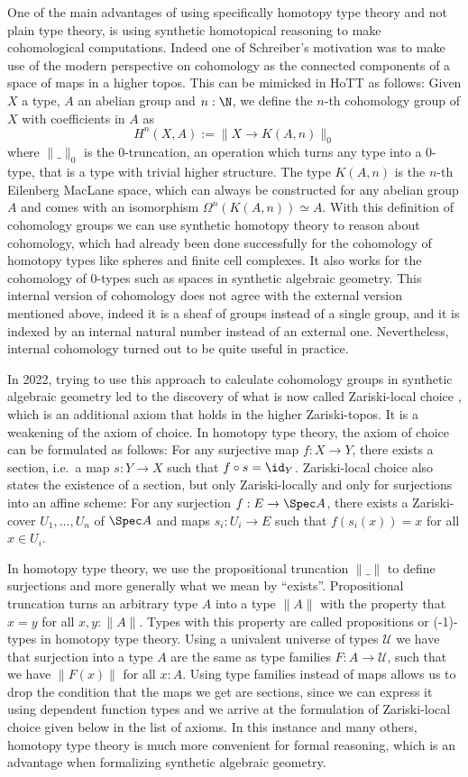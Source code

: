 One of the main advantages of using specifically homotopy type theory and not plain type theory, is using synthetic homotopical reasoning to make cohomological computations. Indeed one of Schreiber's motivation was to make use of the modern perspective on cohomology as the connected components of a space of maps in a higher topos. This can be mimicked in HoTT as follows: Given $X$ a type, $A$ an abelian group and $n:\N$, we define the $n$-th cohomology group of $X$ with coefficients in $A$ as
\[ H^n(X,A):=\| X\to K(A,n) \|_0\]
 where $\|\_\|_0$ is the $0$-truncation, an operation which turns any type into a $0$-type, that is a type with trivial higher structure. The type $K(A,n)$ is the $n$-th Eilenberg MacLane space, which can always be constructed for any abelian group $A$ and comes with an isomorphism $\Omega^n(K(A,n))\simeq A$.
With this definition of cohomology groups we can use synthetic homotopy theory to reason about cohomology, which had already been done successfully for the cohomology of homotopy types like spheres and finite cell complexes. It also works for the cohomology of $0$-types such as spaces in synthetic algebraic geometry.
This internal version of cohomology does not agree with the external version mentioned above, indeed it is a sheaf of groups instead of a single group, and it is indexed by an internal natural number instead of an external one. Nevertheless, internal cohomology turned out to be quite useful in practice.

In 2022, trying to use this approach to calculate cohomology groups in synthetic algebraic geometry led to the discovery of what is now called Zariski-local choice \cite{draft},
which is an additional axiom that holds in the higher Zariski-topos.
It is a weakening of the axiom of choice. In homotopy type theory, the axiom of choice can be formulated as follows: For any surjective map $f:X\to Y$, there exists a section, i.e.\ a map $s:Y\to X$ such that $f\circ s=\id_Y$.
Zariski-local choice also states the existence of a section, but only Zariski-locally and only for surjections into an affine scheme: For any surjection $f:E\to \Spec A$,
there exists a Zariski-cover $U_1,\dots,U_n$ of $\Spec A$ and maps $s_i:U_i\to E$ such that $f(s_i(x))=x$ for all $x\in U_i$.

In homotopy type theory, we use the propositional truncation $\|\_\|$ to define surjections and more generally what we mean by ``exists''.
Propositional truncation turns an arbitrary type $A$ into a type $\|A\|$ with the property that $x=y$ for all $x,y:\|A\|$.
Types with this property are called propositions or (-1)-types in homotopy type theory.
Using a univalent universe of types $\mathcal U$ we have that surjection into a type $A$ are the same as type families $F:A\to \mathcal U$, such that we have $\|F(x)\|$ for all $x: A$.
Using type families instead of maps allows us to drop the condition that the maps we get are sections, since we can express it using dependent function types and we arrive at the formulation of Zariski-local choice given below in the list of axioms.
In this instance and many others, homotopy type theory is much more convenient for formal reasoning, which is an advantage when formalizing synthetic algebraic geometry.

